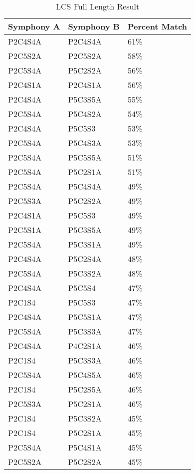\begin{longtable}{|l|l|l|}
\caption{LCS Full Length Result}
\label{my-label}\\
\hline
Symphony A & Symphony B & Percent Match \\ \hline
\endfirsthead
%
\endhead
%
P2C4S4A & P2C4S4A & 61\% \\ \hline
P2C5S2A & P2C5S2A & 58\% \\ \hline
P2C5S4A & P5C2S2A & 56\% \\ \hline
P2C4S1A & P2C4S1A & 56\% \\ \hline
P2C4S4A & P5C3S5A & 55\% \\ \hline
P2C5S4A & P5C4S2A & 54\% \\ \hline
P2C4S4A & P5C5S3 & 53\% \\ \hline
P2C5S4A & P5C4S3A & 53\% \\ \hline
P2C5S4A & P5C5S5A & 51\% \\ \hline
P2C5S4A & P5C2S1A & 51\% \\ \hline
P2C5S4A & P5C4S4A & 49\% \\ \hline
P2C5S3A & P5C2S2A & 49\% \\ \hline
P2C4S1A & P5C5S3 & 49\% \\ \hline
P2C5S1A & P5C3S5A & 49\% \\ \hline
P2C5S4A & P5C3S1A & 49\% \\ \hline
P2C4S4A & P5C2S4A & 48\% \\ \hline
P2C5S4A & P5C3S2A & 48\% \\ \hline
P2C4S4A & P5C5S4 & 47\% \\ \hline
P2C1S4 & P5C5S3 & 47\% \\ \hline
P2C4S4A & P5C5S1A & 47\% \\ \hline
P2C5S4A & P5C3S3A & 47\% \\ \hline
P2C4S4A & P4C2S1A & 46\% \\ \hline
P2C1S4 & P5C3S3A & 46\% \\ \hline
P2C5S4A & P5C4S5A & 46\% \\ \hline
P2C1S4 & P5C2S5A & 46\% \\ \hline
P2C5S3A & P5C2S1A & 46\% \\ \hline
P2C1S4 & P5C3S2A & 45\% \\ \hline
P2C1S4 & P5C2S1A & 45\% \\ \hline
P2C5S4A & P5C4S1A & 45\% \\ \hline
P2C5S2A & P5C2S2A & 45\% \\ \hline
\end{longtable}

